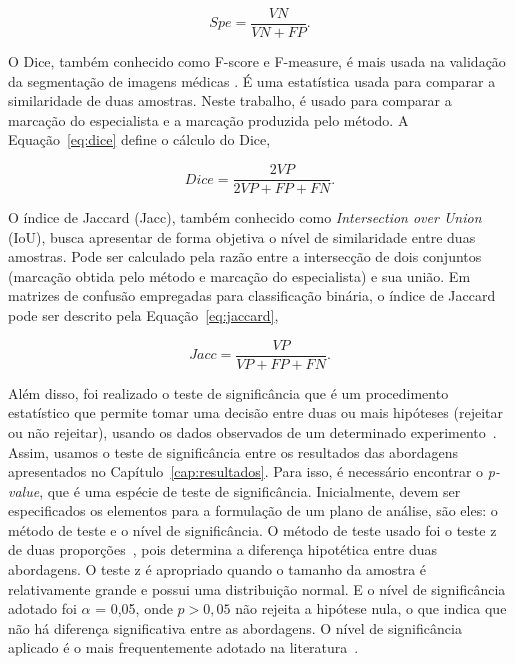 \begin{equation}
\label{eq:especificidade}
Spe = \frac{VN}{VN + FP}.
\end{equation}

O Dice, também conhecido como F-score e F-measure, é mais usada na validação da segmentação de imagens médicas \cite{taha2015metrics}. É uma estatística usada para comparar a similaridade de duas amostras. Neste trabalho, é usado para comparar a marcação do especialista e a marcação produzida pelo método. A Equação~\ref{eq:dice} define o cálculo do Dice,

\begin{equation}
\label{eq:dice}
Dice = \frac{2VP}{2VP + FP + FN}.
\end{equation}

O índice de Jaccard (Jacc), também conhecido como \textit{Intersection over Union} (IoU), busca apresentar de forma objetiva o nível de similaridade entre duas amostras. Pode ser calculado pela razão entre a intersecção de dois conjuntos (marcação obtida pelo método e marcação do especialista) e sua união. Em matrizes de confusão empregadas para classificação binária, o índice de Jaccard pode ser descrito pela Equação~\ref{eq:jaccard},

\begin{equation}
\label{eq:jaccard}
Jacc = \frac{VP}{VP+FP+FN}.
\end{equation}

Além disso, foi realizado o teste de significância que é um procedimento estatístico que permite tomar uma decisão entre duas ou mais hipóteses (rejeitar ou não rejeitar), usando os dados observados de um determinado experimento~\cite{statistical1982, zou2003}. Assim, usamos o teste de significância entre os resultados das abordagens apresentados no Capítulo~\ref{cap:resultados}. Para isso, é necessário encontrar o \textit{p-value}, que é uma espécie de teste de significância. Inicialmente, devem ser especificados os elementos para a formulação de um plano de análise, são eles: o método de teste e o nível de significância. O método de teste usado foi o teste z de duas proporções~\cite{zou2003}, pois determina a diferença hipotética entre duas abordagens. O teste z é apropriado quando o tamanho da amostra é relativamente grande e possui uma distribuição normal. E o nível de significância adotado foi $\alpha$ = 0,05, onde $p>0,05$ não rejeita a hipótese nula, o que indica que não há diferença significativa entre as abordagens. O nível de significância aplicado é o mais frequentemente adotado na literatura~\cite{gauvreau19945}.

